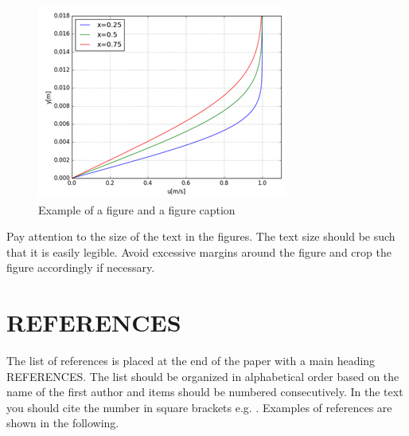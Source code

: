 \documentclass{cfm_paper}
\begin{document}
\begin{figure}
    \includegraphics[width = \columnwidth]{cfm_test.png}
    \caption{Example of a figure and a figure caption} %
    \label{fig:ExampleFigure}
\end{figure}

Pay attention to the size of the text in the figures. The text size should be such that it is easily legible. Avoid excessive margins around the figure and crop the figure accordingly if necessary.

\section*{REFERENCES}
The list of references is placed at the end of the paper with a main heading REFERENCES. The list should be organized in alphabetical order based on the name of the first author and items should be numbered consecutively. In the text you should cite the number in square brackets e.g. \cite{Hanninen2016, Tu2012}. %
Examples of references are shown in the following.

\printbibliography[title={REFERENCES}] %
\end{document}
